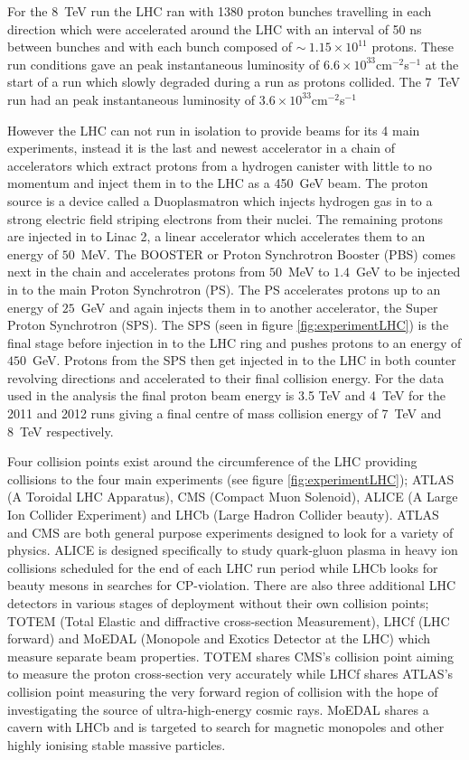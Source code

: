 	For the 8~TeV run the LHC ran with 1380 proton bunches travelling in each direction which were accelerated around the LHC with an interval of 50 ns between bunches and with each bunch composed of $\sim~1.15\times10^{11}$ protons. These run conditions gave an peak instantaneous luminosity of $6.6\times10^{33}$cm$^{-2}$s$^{-1}$ at the start of a run which slowly degraded during a run as protons collided. The 7~TeV run had an peak instantaneous luminosity of $3.6\times10^{33}$cm$^{-2}$s$^{-1}$


	However the LHC can not run in isolation to provide beams for its 4 main experiments, instead it is the last and newest accelerator in a chain of accelerators which extract protons from a hydrogen canister with little to no momentum and inject them in to the LHC as a 450~GeV beam.
	The proton source is a device called a Duoplasmatron which injects hydrogen gas in to a strong electric field striping electrons from their nuclei. The remaining protons are injected in to Linac 2, a linear accelerator which accelerates them to an energy of $50$~MeV. The BOOSTER or Proton Synchrotron Booster (PBS) comes next in the chain and accelerates protons from $50$~MeV to $1.4$~GeV to be injected in to the main Proton Synchrotron (PS). The PS accelerates protons up to an energy of $25$~GeV and again injects them in to another accelerator, the Super Proton Synchrotron (SPS). The SPS (seen in figure \ref{fig:experimentLHC}) is the final stage before injection in to the LHC ring and pushes protons to an energy of $450$~GeV. Protons from the SPS then get injected in to the LHC in both counter revolving directions and accelerated to their final collision energy. For the data used in the analysis the final proton beam energy is 3.5 TeV and 4~TeV for the 2011 and 2012 runs giving a final centre of mass collision energy of 7~TeV and 8~TeV respectively.

	Four collision points exist around the circumference of the LHC providing collisions to the four main experiments (see figure \ref{fig:experimentLHC}); ATLAS (A Toroidal LHC Apparatus), CMS (Compact Muon Solenoid), ALICE (A Large Ion Collider Experiment) and LHCb (Large Hadron Collider beauty). ATLAS and CMS are both general purpose experiments designed to look for a variety of physics. ALICE is designed specifically to study quark-gluon plasma in heavy ion collisions scheduled for the end of each LHC run period while LHCb looks for beauty mesons in searches for CP-violation.
	There are also three additional LHC detectors in various stages of deployment without their own collision points; TOTEM (Total Elastic and diffractive cross-section Measurement), LHCf (LHC forward) and MoEDAL (Monopole and Exotics Detector at the LHC) which measure separate beam properties. TOTEM shares CMS's collision point aiming to measure the proton cross-section very accurately while LHCf shares ATLAS's collision point measuring the very forward region of collision with the hope of investigating the source of ultra-high-energy cosmic rays. MoEDAL shares a cavern with LHCb and is targeted to search for magnetic monopoles and other highly ionising stable massive particles.


